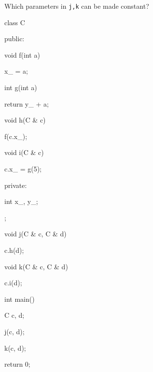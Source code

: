 Which parameters in \texttt{j,k} can be made constant?



\begin{consolethree}[escapeinside=||]

class C

{

public:

    void f(int a)

    {

        x_ = a;

    }

    int g(int a)

    {

        return y_ + a;

    }

    void h(C & c)

    {

        f(c.x_);

    }

    void i(C & c)

    {

        c.x_ = g(5);

    }

private:

    int x_, y_;

};



void j(C & c, C & d)

{

    c.h(d);

}



void k(C & c, C & d)

{

    c.i(d);

}



int main()

{

    C c, d;

    j(c, d);

    k(c, d);

    return 0;

}

\end{consolethree}

